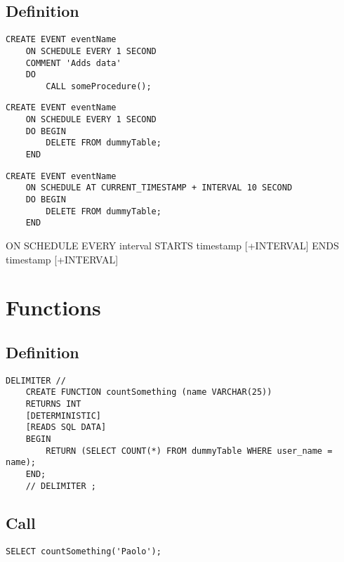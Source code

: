 \documentclass{article}
\begin{document}
\subsection{Definition}

\begin{lstlisting}[style=sql]
    CREATE EVENT eventName
    ON SCHEDULE EVERY 1 SECOND
    COMMENT 'Adds data'
    DO
        CALL someProcedure();
\end{lstlisting}

\begin{lstlisting}[style=sql]
    CREATE EVENT eventName
    ON SCHEDULE EVERY 1 SECOND
    DO BEGIN
        DELETE FROM dummyTable;
    END
\end{lstlisting}

\begin{lstlisting}[style=sql]
    CREATE EVENT eventName
    ON SCHEDULE AT CURRENT_TIMESTAMP + INTERVAL 10 SECOND
    DO BEGIN
        DELETE FROM dummyTable;
    END
\end{lstlisting}

ON SCHEDULE EVERY interval STARTS timestamp [+INTERVAL] ENDS timestamp [+INTERVAL]

\pagebreak

\section{Functions}

\subsection{Definition}

\begin{lstlisting}[style=sql]
    DELIMITER //
    CREATE FUNCTION countSomething (name VARCHAR(25))
    RETURNS INT
    [DETERMINISTIC]
    [READS SQL DATA]
    BEGIN
        RETURN (SELECT COUNT(*) FROM dummyTable WHERE user_name = name);
    END;
    // DELIMITER ;
\end{lstlisting}

\subsection{Call}

\begin{lstlisting}[style=sql]
    SELECT countSomething('Paolo');
\end{lstlisting}

\pagebreak
\end{document}

